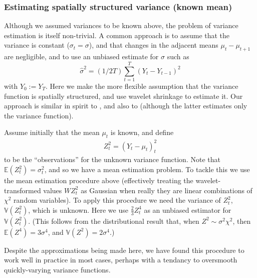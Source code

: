 \documentclass[12pt]{article}
\newcommand{\s}{\sigma}
\begin{document}
\subsubsection{Estimating spatially structured variance (known mean)}

Although we assumed variances to be known above, the problem of variance estimation is itself non-trivial. 
A common approach is to assume that the variance is constant ($\sigma_t=\sigma$), and that changes in the adjacent means $\mu_t-\mu_{t+1}$ are negligible, and to use an unbiased estimate for $\sigma$ such as
\begin{equation} \label{eq:constvar}
\hat{\sigma}^2 = (1/2T) \sum_{t=1}^{T} (Y_t-Y_{t-1})^2
\end{equation}
with $Y_0:=Y_T$.
Here we make the more flexible assumption that the variance function is spatially structured, and use wavelet shrinkage to estimate it. Our approach is similar in spirit to \cite{Delouille2004Smooth}, and also to \cite{Cai2008Adaptive} (although the latter estimates only the variance function).

Assume initially that the mean $\mu_t$ is known, and define
\begin{eqnarray}\label{eq:varobs1}
Z_t^2=(Y_t-\mu_t)^2_t
\end{eqnarray}
to be the ``observations'' for the unknown variance function. Note that $\mathbb{E}(Z_t^2)=\s_t^2$, and so
we have a mean estimation problem. To tackle this we use the mean estimation procedure above (effectively treating the wavelet-transformed values $WZ_t^2$ as Gaussian when really they are linear combinations of $\chi^2$ random variables). To apply this procedure we need the variance
of $Z_t^2$, $\mathbb{V}(Z_t^2)$, which is unknown.
Here we use $\frac{2}{3}Z_t^4$ as an 
unbiased estimator for $\mathbb{V}(Z_t^2)$. (This follows from the distributional result that, when $Z^2 \sim \s^2 \chi^2$, then $\mathbb{E}(Z^4)= 3\s^4$, and $\mathbb{V}(Z^2)=2\s^4$.)

Despite the approximations being made here, we have found this procedure to work well in practice in most cases,
perhaps with a tendancy to oversmooth quickly-varying variance functions. 
\end{document}
